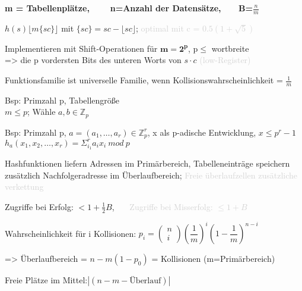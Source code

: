 \textbf{m = Tabellenplätze, ~~~ n=Anzahl der Datensätze, ~~~B=$\frac{n}{m}$} 

$h(s) \lfloor m \lbrace sc \rbrace \rfloor$ mit $ \lbrace sc \rbrace  = sc - \lfloor sc \rfloor$;
\textcolor{lightgray}{optimal mit c = $0.5(1+\sqrt{5})$ }

Implementieren mit Shift-Operationen für $\mathbf{m = 2^p}$, p$\leq$ wortbreite\\
=> die p vordersten Bits des unteren Worts von $s\cdot c$ \textcolor{lightgray}{(low-Register)}



Funktionsfamilie ist universelle Familie, wenn Kollisionswahrscheinlichkeit = $\frac{1}{m}$

Bsp: Primzahl p, Tabellengröße \\  $m \leq p$; Wähle $a,b \in \mathbb{Z}_p$\\

Bsp: Primzahl p, $a=(a_1,\dots,a_r) \in \mathbb{Z}_p^r$, x als p-adische Entwicklung, $x \leq p^r-1$\\
$h_a( x_1, x_2, \dots ,x_r ) = \Sigma_{i_1}^r a_i x_i ~mod ~p$

Hashfunktionen liefern Adressen im Primärbereich, Tabelleneinträge speichern zusätzlich Nachfolgeradresse im Überlaufbereich; \textcolor{lightgray}{Freie überlaufzellen zusätzliche verkettung}


Zugriffe bei Erfolg: $<1+\frac{1}{2}B$, ~~~\textcolor{lightgray}{Zugriffe bei Misserfolg: $\leq 1+ B$}

Wahrscheinlichkeit für i Kollisionen: $p_i = \left( \begin{array}{c}n \\ i\end{array} \right) \left( \dfrac{1}{m} \right)^i \left( 1- \dfrac{1}{m} \right)^{n-i} $

=> Überlaufbereich = $n-m(1-p_0)$  =  Kollisionen (m=Primärbereich) 

Freie Plätze im Mittel:$ |(n - m - \text{Überlauf}) |$



